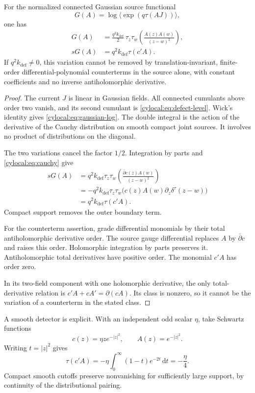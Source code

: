 \begin{proposition}\label{cylocal:prop:ward}
For the normalized connected Gaussian source functional
\[
 G(A)=\log\langle\exp(q\tau(AJ))\rangle,
\]
one has
\begin{align}
 G(A)&=\frac{q^2k_{\mathrm{def}}}{2}\,
       \tau_z\tau_w\left(\frac{A(z)A(w)}{(z-w)^2}\right),
       \label{cylocal:eq:gaussian-log}\\
 sG(A)&=q^2k_{\mathrm{def}}\tau(c'A).
       \label{cylocal:eq:ward}
\end{align}
If $q^2k_{\mathrm{def}}\ne0$, this variation cannot be removed by
translation-invariant, finite-order differential-polynomial
counterterms in the source alone, with constant coefficients and
no inverse antiholomorphic derivative.
\end{proposition}
\begin{proof}
The current $J$ is linear in Gaussian fields. All connected
cumulants above order two vanish, and its second cumulant is
\eqref{cylocal:eq:defect-level}. Wick's identity gives
\eqref{cylocal:eq:gaussian-log}. The double integral is the action
of the derivative of the Cauchy distribution on smooth compact
joint sources. It involves no product of distributions on the
diagonal.

The two variations cancel the factor $1/2$. Integration by parts
and \eqref{cylocal:eq:cauchy} give
\begin{align*}
 sG(A)
 &=q^2k_{\mathrm{def}}\tau_z\tau_w
       \left(\frac{\bar\partial c(z)A(w)}{(z-w)^2}\right)\\
 &=-q^2k_{\mathrm{def}}\tau_z\tau_w
       \bigl(c(z)A(w)\partial_z\delta^\tau(z-w)\bigr)\\
 &=q^2k_{\mathrm{def}}\tau(c'A).
\end{align*}
Compact support removes the outer boundary term.

For the counterterm assertion, grade differential monomials by
their total antiholomorphic derivative order. The source gauge
differential replaces $A$ by $\bar\partial c$ and raises this order.
Holomorphic integration by parts preserves it. Antiholomorphic
total derivatives have positive order. The monomial $c'A$ has
order zero.

In its two-field component with one holomorphic
derivative, the only total-derivative relation is
$c'A+cA'=\partial(cA)$. Its class is nonzero, so it cannot be the
variation of a counterterm in the stated class.
\end{proof}

A smooth detector is explicit. With an independent odd scalar
$\eta$, take Schwartz functions
\[
 c(z)=\eta z e^{-|z|^2},\qquad A(z)=e^{-|z|^2}.
\]
Writing $t=|z|^2$ gives
\[
 \tau(c'A)=-\eta\int_0^\infty(1-t)e^{-2t}\,\mathrm dt
          =-\frac\eta4.
\]
Compact smooth cutoffs preserve nonvanishing for sufficiently
large support, by continuity of the distributional pairing.

